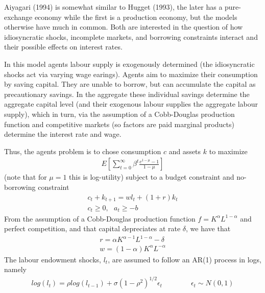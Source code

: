 %
 
Aiyagari (1994) is somewhat similar to Hugget (1993), the later has a pure-exchange economy while
the first is a production economy, but the models otherwise have much in common. Both are interested
in the question of how idiosyncratic shocks, incomplete markets, and borrowing constraints interact and
their possible effects on interest rates.

In this model agents labour supply is exogenously determined (the idiosyncratic shocks act via varying wage 
earings). Agents aim to maximize their consumption by saving capital. They are unable to borrow, but can
accumulate the capital as precautionary savings. In the aggregate these individual savings determine the aggregate
capital level (and their exogenous labour supplies the aggregate labour supply), which in turn, via the assumption
of a Cobb-Douglas production function and competitive markets (so factors are paid marginal products) determine 
the interest rate and wage.


Thus, the agents problem is to chose consumption $c$ and assets $k$ to maximize
\begin{align*}
 E[\sum_{t=0}^{\infty} \beta^t \frac{c^{1-\mu}-1}{1-\mu}]
\end{align*}
(note that for $\mu=1$ this is log-utility) subject to a budget constraint and no-borrowing constraint
\begin{align*}
 c_t+k_{t+1}=w l_t + (1+r)k_t \\
 c_t \geq 0, \text{ } a_t \geq -b
\end{align*}
From the assumption of a Cobb-Douglas production function $f=K^{\alpha}L^{1-\alpha}$ and perfect competition, and that capital
depreciates at rate $\delta$, we have that
\begin{align}
 r=\alpha K^{\alpha-1} L^{1-\alpha} -\delta \label{Aiyagari:eqn:r} \\
 w=(1-\alpha) K^{\alpha} L^{-\alpha} \label{Aiyagari:eqn:w}
\end{align}
The labour endowment shocks, $l_t$, are assumed to follow an AR(1) process in logs, namely
\begin{align*}
 log(l_t)=\rho log(l_{t-1})+\sigma(1-\rho^2)^{1/2} \epsilon_t        \qquad \qquad \epsilon_t \sim N(0,1)
\end{align*}

